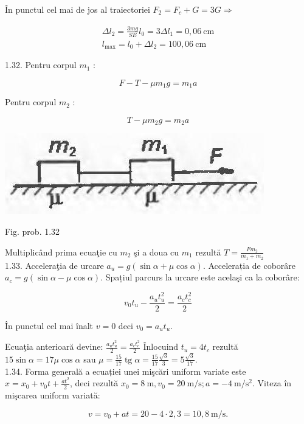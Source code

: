 \documentclass[10pt]{article}
\begin{document}
În punctul cel mai de jos al traiectoriei $F_{2}=F_{c}+G=3 G \Rightarrow$

$$
\begin{gathered}
\Delta l_{2}=\frac{3 m g}{S E} l_{0}=3 \Delta l_{1}=0,06 \mathrm{~cm} \\
l_{\max }=l_{0}+\Delta l_{2}=100,06 \mathrm{~cm}
\end{gathered}
$$

1.32. Pentru corpul $m_{1}$ :

$$
F-T-\mu m_{1} g=m_{1} a
$$

Pentru corpul $m_{2}$ :

$$
T-\mu m_{2} g=m_{2} a
$$

\begin{center}
\includegraphics[max width=\textwidth]{2025_07_01_5b3ff9fa0d508c8e9f17g-203}
\end{center}

Fig. prob. 1.32

Multiplicând prima ecuaţie cu $m_{2}$ şi a doua cu $m_{1}$ rezultă $T=\frac{F m_{2}}{m_{1}+m_{2}}$\\
1.33. Acceleraţia de urcare $a_{u}=g(\sin \alpha+\mu \cos \alpha)$. Accelerația de coborâre $a_{c}=g(\sin \alpha-\mu \cos \alpha)$. Spațiul parcurs la urcare este acelaşi ca la coborâre:

$$
v_{0} t_{u}-\frac{a_{u} t_{u}^{2}}{2}=\frac{a_{c} t_{c}^{2}}{2}
$$

În punctul cel mai înalt $v=0$ deci $v_{0}=a_{u} t_{u}$.

Ecuaţia anterioară devine: $\frac{a_{u} t_{u}^{2}}{2}=\frac{a_{c} t_{c}^{2}}{2}$ Înlocuind $t_{u}=4 t_{c}$ rezultă $15 \sin \alpha=17 \mu \cos \alpha$ sau $\mu=\frac{15}{17} \operatorname{tg} \alpha=\frac{15}{17} \frac{\sqrt{3}}{3}=5 \frac{\sqrt{3}}{17}$.\\
1.34. Forma generală a ecuației unei mişcări uniform variate este $x=x_{0}+v_{0} t+\frac{a t^{2}}{2}$, deci rezultă $x_{0}=8 \mathrm{~m}, v_{0}=20 \mathrm{~m} / \mathrm{s} ; a=-4 \mathrm{~m} / \mathrm{s}^{2}$. Viteza în mişcarea uniform variată:

$$
v=v_{0}+a t=20-4 \cdot 2,3=10,8 \mathrm{~m} / \mathrm{s} .
$$
\end{document}
